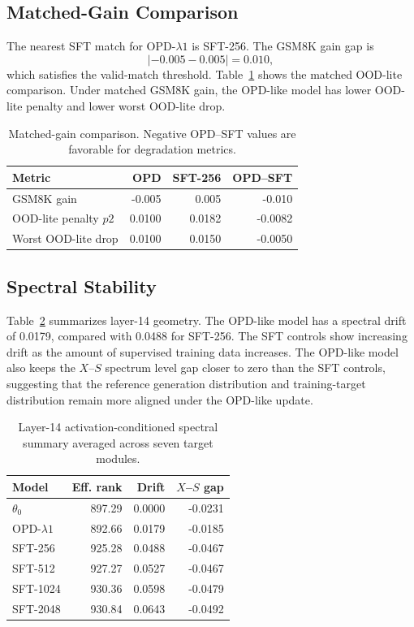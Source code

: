 \documentclass[letterpaper]{article}
\begin{document}
\subsection{Matched-Gain Comparison}

The nearest SFT match for OPD-$\lambda1$ is SFT-256.
The GSM8K gain gap is
\[
|-0.005 - 0.005| = 0.010,
\]
which satisfies the valid-match threshold.
Table~\ref{tab:matched} shows the matched OOD-lite comparison.
Under matched GSM8K gain, the OPD-like model has lower OOD-lite penalty and lower worst OOD-lite drop.

\begin{table}[t]
\centering
\small
\begin{tabular}{lrrr}
\toprule
Metric & OPD & SFT-256 & OPD--SFT \\
\midrule
GSM8K gain & -0.005 & 0.005 & -0.010 \\
OOD-lite penalty $p2$ & 0.0100 & 0.0182 & -0.0082 \\
Worst OOD-lite drop & 0.0100 & 0.0150 & -0.0050 \\
\bottomrule
\end{tabular}
\caption{Matched-gain comparison. Negative OPD--SFT values are favorable for degradation metrics.}
\label{tab:matched}
\end{table}

\subsection{Spectral Stability}

Table~\ref{tab:geometry_summary} summarizes layer-14 geometry.
The OPD-like model has a spectral drift of 0.0179, compared with 0.0488 for SFT-256.
The SFT controls show increasing drift as the amount of supervised training data increases.
The OPD-like model also keeps the $X$--$S$ spectrum level gap closer to zero than the SFT controls, suggesting that the reference generation distribution and training-target distribution remain more aligned under the OPD-like update.

\begin{table}[t]
\centering
\small
\begin{tabular}{lrrr}
\toprule
Model & Eff. rank & Drift & $X$--$S$ gap \\
\midrule
$\theta_0$ & 897.29 & 0.0000 & -0.0231 \\
OPD-$\lambda1$ & 892.66 & 0.0179 & -0.0185 \\
SFT-256 & 925.28 & 0.0488 & -0.0467 \\
SFT-512 & 927.27 & 0.0527 & -0.0467 \\
SFT-1024 & 930.36 & 0.0598 & -0.0479 \\
SFT-2048 & 930.84 & 0.0643 & -0.0492 \\
\bottomrule
\end{tabular}
\caption{Layer-14 activation-conditioned spectral summary averaged across seven target modules.}
\label{tab:geometry_summary}
\end{table}
\end{document}
